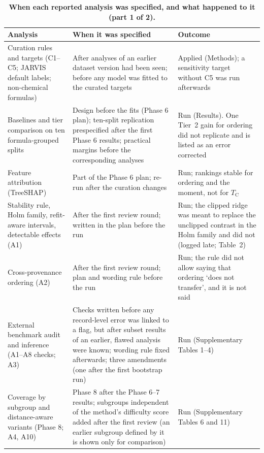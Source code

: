 \documentclass[pdflatex,sn-nature]{sn-jnl}
\newcommand{\Tc}{\ensuremath{T_\mathrm{C}}}
\begin{document}
\begin{table}[!ht]
\end{table}

\begin{table}[!ht]
\caption{\textbf{When each reported analysis was specified, and what happened to it (part 1 of 2).}}\label{tab:s13}%
\setlength{\tabcolsep}{3pt}%
\begin{tabular}{@{}>{\raggedright\arraybackslash}p{88pt}>{\raggedright\arraybackslash}p{150pt}>{\raggedright\arraybackslash}p{116pt}@{}}
\toprule
Analysis & When it was specified & Outcome \\
\midrule
Curation rules and targets (C1--C5; JARVIS default labels; non-chemical formulas) & After analyses of an earlier dataset version had been seen; before any model was fitted to the curated targets & Applied (Methods); a sensitivity target without C5 was run afterwards \\
Baselines and tier comparison on ten formula-grouped splits & Design before the fits (Phase 6 plan); ten-split replication prespecified after the first Phase 6 results; practical margins before the corresponding analyses & Run (Results). One Tier~2 gain for ordering did not replicate and is listed as an error corrected \\
Feature attribution (TreeSHAP) & Part of the Phase 6 plan; re-run after the curation changes & Run; rankings stable for ordering and the moment, not for \Tc{} \\
Stability rule, Holm family, refit-aware intervals, detectable effects (A1) & After the first review round; written in the plan before the run & Run; the clipped ridge was meant to replace the unclipped contrast in the Holm family and did not (logged late; Table~2) \\
Cross-provenance ordering (A2) & After the first review round; plan and wording rule before the run & Run; the rule did not allow saying that ordering `does not transfer', and it is not said \\
External benchmark audit and inference (A1--A8 checks; A3) & Checks written before any record-level error was linked to a flag, but after subset results of an earlier, flawed analysis were known; wording rule fixed afterwards; three amendments (one after the first bootstrap run) & Run (Supplementary Tables 1--4) \\
Coverage by subgroup and distance-aware variants (Phase 8; A4, A10) & Phase 8 after the Phase 6--7 results; subgroups independent of the method's difficulty score added after the first review (an earlier subgroup defined by it is shown only for comparison) & Run (Supplementary Tables 6 and 11) \\

\end{tabular}
\end{table}
\end{document}
